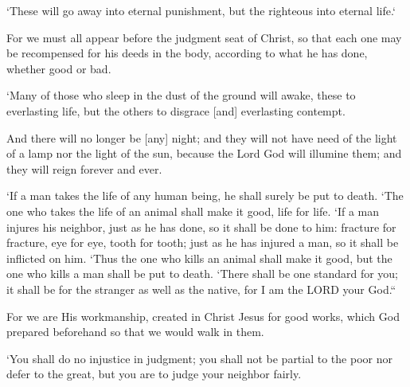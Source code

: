 \begin{scripture}[Matthew 25:46]
    `These will go away into eternal punishment, but the righteous into eternal life.`
\end{scripture}

\begin{scripture}[2 Corinthians 5:10]
    For we must all appear before the judgment seat of Christ, so that each one may be recompensed for his deeds in the body, according to what he has done, whether good or bad.
\end{scripture}

\begin{scripture}[Daniel 12:2]
    `Many of those who sleep in the dust of the ground will awake, these to everlasting life, but the others to disgrace [and] everlasting contempt.
\end{scripture}

\begin{scripture}[Revelation 22:5]
    And there will no longer be [any] night; and they will not have need of the light of a lamp nor the light of the sun, because the Lord God will illumine them; and they will reign forever and ever.
\end{scripture}

\begin{scripture}[Leviticus 24:17-22]
    `If a man takes the life of any human being, he shall surely be put to death.
    `The one who takes the life of an animal shall make it good, life for life.
    `If a man injures his neighbor, just as he has done, so it shall be done to him:
    fracture for fracture, eye for eye, tooth for tooth; just as he has injured a man, so it shall be inflicted on him.
    `Thus the one who kills an animal shall make it good, but the one who kills a man shall be put to death.
    `There shall be one standard for you; it shall be for the stranger as well as the native, for I am the LORD your God.``
\end{scripture}

\begin{scripture}[Ephesians 2:10]
    For we are His workmanship, created in Christ Jesus for good works, which God prepared beforehand so that we would walk in them.
\end{scripture}

\begin{scripture}[Leviticus 19:15]
    `You shall do no injustice in judgment; you shall not be partial to the poor nor defer to the great, but you are to judge your neighbor fairly.
\end{scripture}

